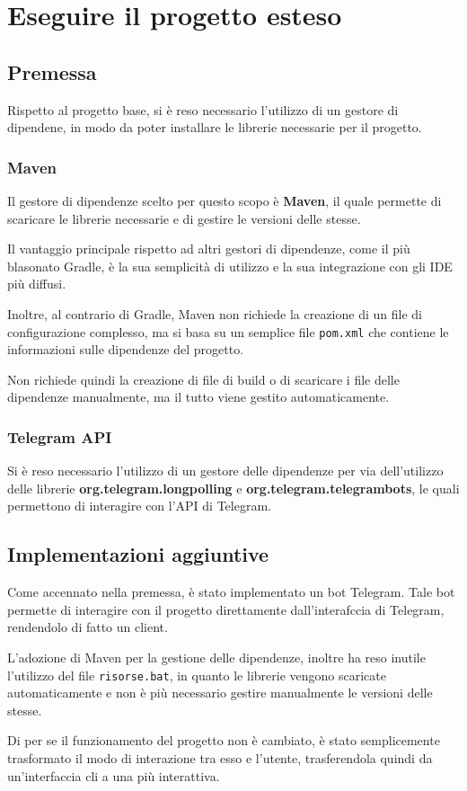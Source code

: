 \section{Eseguire il progetto esteso}

\subsection{Premessa}

Rispetto al progetto base, si è reso necessario l'utilizzo di un gestore di dipendene, in modo da poter installare le librerie necessarie per il progetto. 

\subsubsection*{Maven}

Il gestore di dipendenze scelto per questo scopo è \textbf{Maven}, il quale permette di scaricare le librerie necessarie e di gestire le versioni delle stesse.

Il vantaggio principale rispetto ad altri gestori di dipendenze, come il più blasonato Gradle, è la sua semplicità di utilizzo e la sua integrazione con gli IDE più diffusi. 

Inoltre, al contrario di Gradle, Maven non richiede la creazione di un file di configurazione complesso, ma si basa su un semplice file \texttt{pom.xml} che contiene le informazioni sulle dipendenze del progetto. 

Non richiede quindi la creazione di file di build o di scaricare i file delle dipendenze manualmente, ma il tutto viene gestito automaticamente. 

\subsubsection*{Telegram API}

Si è reso necessario l'utilizzo di un gestore delle dipendenze per via dell'utilizzo delle librerie \textbf{org.telegram.longpolling} e \textbf{org.telegram.telegrambots}, le quali permettono di interagire con l'API di Telegram. 

\subsection{Implementazioni aggiuntive}

Come accennato nella premessa, è stato implementato un bot Telegram. Tale bot permette di interagire con il progetto direttamente dall'interafccia di Telegram, rendendolo di fatto un client. 

L'adozione di Maven per la gestione delle dipendenze, inoltre ha reso inutile l'utilizzo del file \texttt{risorse.bat}, in quanto le librerie vengono scaricate automaticamente e non è più necessario gestire manualmente le versioni delle stesse.

Di per se il funzionamento del progetto non è cambiato, è stato semplicemente trasformato il modo di interazione tra esso e l'utente, trasferendola quindi da un'interfaccia cli a una più interattiva.  



